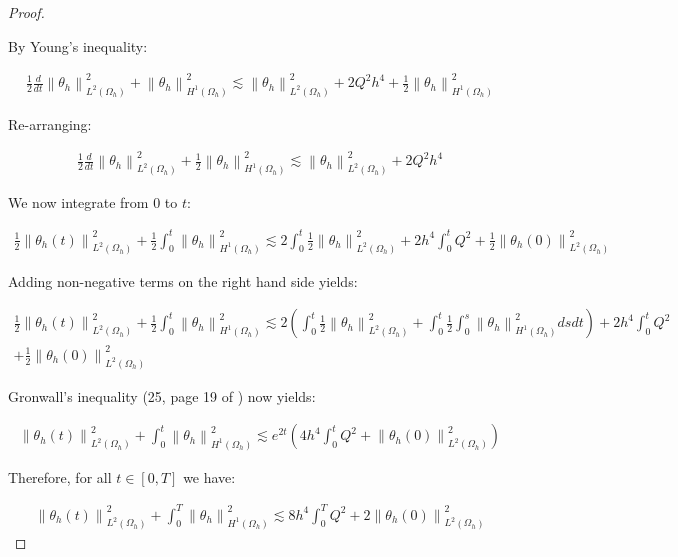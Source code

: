 \documentclass[english,a4paper,9pt,oneside]{scrbook}	%
\theoremstyle{break}
\newenvironment{mproof}[1][\proofname]{%
  \begin{proof}[#1]$ $\par\nobreak\ignorespaces
}{%
  \end{proof}
}
\renewcommand*{\proofname}{Proof}
\theoremstyle{remark}
\newcommand{\norm}[1]{\left\lVert#1\right\rVert}
\begin{document}
\begin{appendices}
\begin{mproof}
By Young's inequality:

\begin{align*}
	\frac{1}{2} \frac{d}{dt} \norm{\theta_h}_{L^2(\Omega_h)}^2 + \norm{\theta_h}^2_{H^1(\Omega_h)} \lesssim \norm{\theta_h}^2_{L^2(\Omega_h)}  + 2Q^2h^4 + \frac{1}{2}\norm{\theta_h}_{H^1(\Omega_h)}^2
\end{align*}

Re-arranging:

\begin{align*}
	\frac{1}{2} \frac{d}{dt} \norm{\theta_h}_{L^2(\Omega_h)}^2 + \frac{1}{2}\norm{\theta_h}^2_{H^1(\Omega_h)} \lesssim \norm{\theta_h}^2_{L^2(\Omega_h)}  + 2Q^2h^4
\end{align*}

We now integrate from $0$ to $t$:

\begin{align*}
	\frac{1}{2} \norm{\theta_h(t)}_{L^2(\Omega_h)}^2 + \frac{1}{2}\int_0^t\norm{\theta_h}^2_{H^1(\Omega_h)} \lesssim 2\int_0^t\frac{1}{2}\norm{\theta_h}^2_{L^2(\Omega_h)}  + 2h^4 \int_0^t Q^2 + \frac{1}{2} \norm{\theta_h(0)}_{L^2(\Omega_h)}^2
\end{align*}

Adding non-negative terms on the right hand side yields:

\begin{align*}
	\frac{1}{2} \norm{\theta_h(t)}_{L^2(\Omega_h)}^2 + \frac{1}{2}\int_0^t\norm{\theta_h}^2_{H^1(\Omega_h)} \lesssim 2\left (\int_0^t\frac{1}{2}\norm{\theta_h}^2_{L^2(\Omega_h)} + \int_0^t\frac{1}{2}\int_0^s\norm{\theta_h}^2_{H^1(\Omega_h)}dsdt\right) + 2h^4 \int_0^t Q^2 \\+ \frac{1}{2} \norm{\theta_h(0)}_{L^2(\Omega_h)}^2
\end{align*}

Gronwall's inequality (25, page 19 of \cite{gilardi}) now yields:

\begin{align*}
	\norm{\theta_h(t)}_{L^2(\Omega_h)}^2 + \int_0^t\norm{\theta_h}^2_{H^1(\Omega_h)} \lesssim  e^{2t } \left ( 4h^4\int_0^t Q^2 + \norm{\theta_h(0)}_{L^2(\Omega_h)}^2 \right)
\end{align*}

Therefore, for all $t \in [0,T]$ we have:

\begin{align}
\label{eqn:theta_energy}
	\norm{\theta_h(t)}_{L^2(\Omega_h)}^2 + \int_0^T\norm{\theta_h}^2_{H^1(\Omega_h)} \lesssim 8h^4\int_0^T Q^2 + 2\norm{\theta_h(0)}_{L^2(\Omega_h)}^2
\end{align}


\end{mproof}
\end{appendices}
\end{document}
